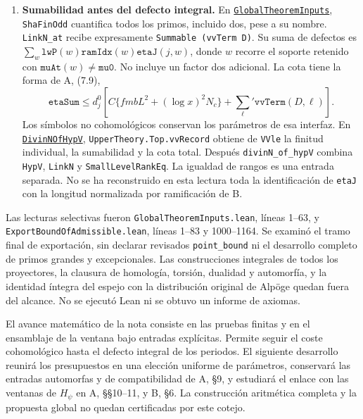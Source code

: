 \begin{enumerate}
\item \textbf{Sumabilidad antes del defecto integral.}
En
\href{https://github.com/CocoSgt/riemann-hypothesis-lean/blob/7cbf7a0c32fca1badf05931879a37c3f8a2b03b4/src/Formalism/SharpRestriction/GlobalTheoremInputs.lean}{\texttt{GlobalTheoremInputs}},
\texttt{ShaFinOdd} cuantifica todos los primos,
incluido dos, pese a su nombre.
\texttt{LinkN\_at} recibe expresamente
\texttt{Summable (vvTerm D)}.
Su suma de defectos es
$\sum_w\texttt{lwP}(w)\texttt{ramIdx}(w)
       \texttt{etaJ}(j,w)$, donde $w$ recorre el soporte
retenido con $\texttt{muAt}(w)\ne\texttt{mu0}$.
No incluye un factor dos adicional.
La cota tiene la forma de A, (7.9),
\[
 \texttt{etaSum}\le d_j^0
  \left[C\{fmbL^2+(\log x)^2N_c\}
                 +\sum_\ell'\texttt{vvTerm}(D,\ell)\right].
\]
Los símbolos no cohomológicos conservan los parámetros
de esa interfaz.
En
\href{https://github.com/CocoSgt/riemann-hypothesis-lean/blob/7cbf7a0c32fca1badf05931879a37c3f8a2b03b4/src/Development/AutomorphicArithmetic/CharacterBoxes/DivinNOfHypV.lean}{\texttt{DivinNOfHypV}},
\texttt{UpperTheory.Top.vvRecord} obtiene de
\texttt{VVle} la finitud individual, la sumabilidad
y la cota total.
Después \texttt{divinN\_of\_hypV} combina
\texttt{HypV}, \texttt{LinkN} y
\texttt{SmallLevelRankEq}.
La igualdad de rangos es una entrada separada.
No se ha reconstruido en esta lectura toda la
identificación de \texttt{etaJ} con la longitud
normalizada por ramificación de B.
\end{enumerate}

Las lecturas selectivas fueron
\texttt{GlobalTheoremInputs.lean}, líneas 1--63, y
\texttt{ExportBoundOfAdmissible.lean}, líneas 1--83
y 1000--1164. Se examinó el tramo final de exportación,
sin declarar revisados \texttt{point\_bound} ni el
desarrollo completo de primos grandes y excepcionales.
Las construcciones integrales de todos los proyectores,
la clausura de homología, torsión, dualidad y automorfía,
y la identidad íntegra del espejo con la distribución
original de Alpöge quedan fuera del alcance.
No se ejecutó Lean ni se obtuvo un informe de axiomas.

El avance matemático de la nota consiste en las pruebas
finitas y en el ensamblaje de la ventana bajo entradas
explícitas. Permite seguir el coste cohomológico hasta
el defecto integral de los periodos.
El siguiente desarrollo reunirá los presupuestos en
una elección uniforme de parámetros, conservará las
entradas automorfas y de compatibilidad de A, §9,
y estudiará el enlace con las ventanas de $H_\psi$
en A, §§10--11, y B, §6.
La construcción aritmética completa y la propuesta
global no quedan certificadas por este cotejo.
\par
\endgroup

